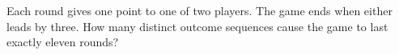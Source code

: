 Each round gives one point to one of two players. The game ends when either leads by three. How many distinct outcome sequences cause the game to last exactly eleven rounds?
